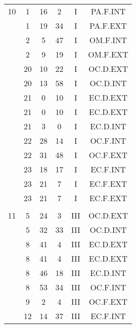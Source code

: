 \documentclass[12pt, a4paper]{article}
\begin{document}
\begin{multicols}{3}
{\begin{tabular}{c c c c c c}
	 	 	 	10 & 1 & 16 & 2 & I & PA.F.INT\\%
	 	 	 	 & 1 & 19 & 34 & I & PA.F.EXT\\%
	 	 	 	 & 2 & 5 & 47 & I & OM.F.INT\\%
	 	 	 	 & 2 & 9 & 19 & I & OM.F.EXT\\%
	 	 	 	 & 20 & 10 & 22 & I & OC.D.EXT\\%
	 	 	 	 & 20 & 13 & 58 & I & OC.D.INT\\%
	 	 	 	 & 21 & 0 & 10 & I & EC.D.EXT\\%
	 	 	 	 & 21 & 0 & 10 & I & EC.D.EXT\\%
	 	 	 	 & 21 & 3 & 0 & I & EC.D.INT\\%
	 	 	 	 & 22 & 28 & 14 & I & OC.F.INT\\%
	 	 	 	 & 22 & 31 & 48 & I & OC.F.EXT\\%
	 	 	 	 & 23 & 18 & 17 & I & EC.F.INT\\%
	 	 	 	 & 23 & 21 & 7 & I & EC.F.EXT\\%
	 	 	 	 & 23 & 21 & 7 & I & EC.F.EXT\\%
	 	 	 	 & & & & & \\%
	 	 	 	11 & 5 & 24 & 3 & III & OC.D.EXT\\%
	 	 	 	 & 5 & 32 & 33 & III & OC.D.INT\\%
	 	 	 	 & 8 & 41 & 4 & III & EC.D.EXT\\%
	 	 	 	 & 8 & 41 & 4 & III & EC.D.EXT\\%
	 	 	 	 & 8 & 46 & 18 & III & EC.D.INT\\%
	 	 	 	 & 8 & 53 & 34 & III & OC.F.INT\\%
	 	 	 	 & 9 & 2 & 4 & III & OC.F.EXT\\%
	 	 	 	 & 12 & 14 & 37 & III & EC.F.INT\\%

\end{tabular}}
\end{multicols}
\end{document}
